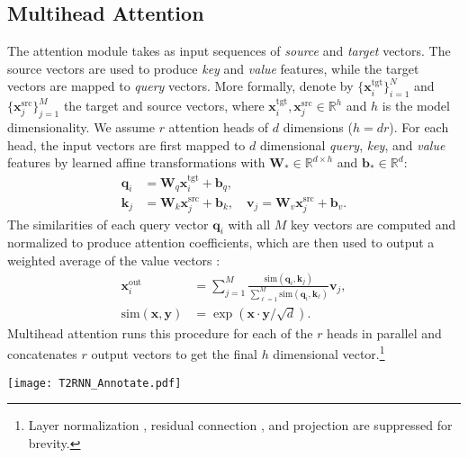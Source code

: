 \documentclass[11pt]{article}
\def\similarity{\mathrm{sim}}
\def\vphi{{\boldsymbol{\phi}}}
\def\vb{{\mathbf{b}}}
\def\vk{{\mathbf{k}}}
\def\vq{{\mathbf{q}}}
\def\vv{{\mathbf{v}}}
\def\vx{{\mathbf{x}}}
\def\vy{{\mathbf{y}}}
\def\mW{{\mathbf{W}}}
\newcommand{\src}{{\mathrm{src}}}
\newcommand{\tgt}{{\mathrm{tgt}}}
\newcommand{\out}{{\mathrm{out}}}
\newcommand{\TRNN}{T2R\xspace}
\begin{document}
\subsection{Multihead Attention}
The attention module takes as input sequences of \textit{source} and \textit{target} vectors.
The source vectors are used to produce \textit{key} and \textit{value} features, while the target vectors are mapped to \textit{query} vectors.
More formally, denote by $\{ \vx_{i}^{\tgt}\}_{i=1}^N$ and $\{\vx_{j}^{\src}\}_{j=1}^M$
the target and source vectors,
where $\vx_{i}^{\tgt}, \vx_{j}^{\src} \in \mathbb{R}^{h}$ and $h$ is the model dimensionality.
We assume $r$ attention heads of $d$ dimensions ($h = dr$).
For each head, the input vectors are first mapped to $d$ dimensional \textit{query}, \textit{key}, and \textit{value} features by learned affine transformations with $\mW_\ast \in \mathbb{R}^{d \times h}$ and $\vb_{\ast} \in \mathbb{R}^{d}$:
\begin{subequations}
\begin{align}
\vq_{i} &= \mW_{q} \vx^{\tgt}_i + \vb_q, \label{eq:q}\\
\vk_{j} &=  \mW_{k} \vx^{\src}_j +\vb_k, \quad
\vv_{j} = \mW_{v}\vx^{\src}_j + \vb_v. 
\label{eq:kv}
\end{align}
\end{subequations}
The similarities of each query vector $\vq_i$ with all $M$ key vectors are computed and normalized to produce attention coefficients, which are then used to output a weighted average of the value vectors \cite{Vaswani2017AttentionIA}:
\begin{subequations}
\begin{align}
\vx^{\out}_i  &=  \sum_{j=1}^M \frac{\similarity\left(\vq_i, \vk_j\right)}{\sum_{\ell=1}^M \similarity\left(\vq_i, \vk_{\ell}\right)} \vv_j,\label{eq:attn}\\
\similarity (\vx, \vy)&=
\exp\left(\vx \cdot \vy/\sqrt{d}\right).\label{eq:dot_exp}
\end{align}
\end{subequations}
Multihead attention runs this procedure for each of the $r$ heads in parallel and concatenates $r$ output vectors to get the final $h$ dimensional vector.\footnote{Layer normalization \cite{Ba2016LayerN}, residual connection \cite{resnet}, and projection are suppressed for brevity.}  
\begin{figure*}[t]
\centering
    \texttt{[image: T2RNN\_Annotate.pdf]}
\caption{Attention computation steps and their time complexity in pretrained transformer and \TRNN models during inference generation. 
Features  $\vphi(\vq_i)$ and $\vphi(\vk_j)$ are directly computed from input vectors,
and $\vq_i$ and $\vk_j$ are never constructed.
$M$: source length; $N$: target length; $h$: model dimensions; $k$: feature size; $r$: \# heads.
}
\label{fig:t2rnn}
\end{figure*}
\end{document}

